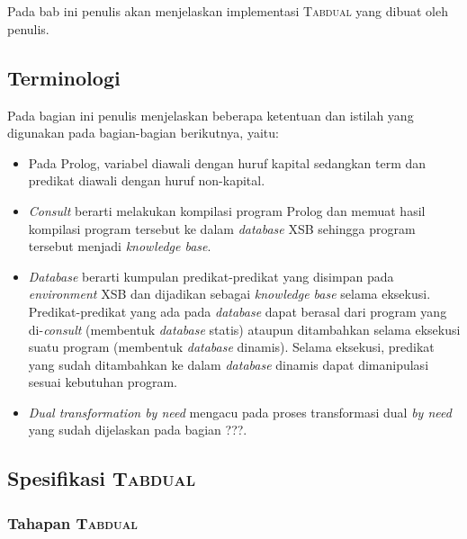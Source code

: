 \chapter{\babEmpat}
Pada bab ini penulis akan menjelaskan implementasi \textsc{Tabdual} yang dibuat oleh penulis.

\section{Terminologi}

Pada bagian ini penulis menjelaskan beberapa ketentuan dan istilah yang digunakan pada bagian-bagian berikutnya, yaitu:

\begin{itemize}
	\item Pada Prolog, variabel diawali dengan huruf kapital sedangkan term dan predikat diawali dengan huruf non-kapital.
	\item \textit{Consult} berarti melakukan kompilasi program Prolog dan memuat hasil kompilasi program tersebut ke dalam \textit{database} XSB sehingga program tersebut menjadi \textit{knowledge base}.
	\item \textit{Database} berarti kumpulan predikat-predikat yang disimpan pada \textit{environment} XSB dan dijadikan sebagai \textit{knowledge base} selama eksekusi. Predikat-predikat yang ada pada \textit{database} dapat berasal dari program yang di-\textit{consult} (membentuk \textit{database} statis) ataupun ditambahkan selama eksekusi suatu program (membentuk \textit{database} dinamis). Selama eksekusi, predikat yang sudah ditambahkan ke dalam \textit{database} dinamis dapat dimanipulasi sesuai kebutuhan program.
	\item \textit{Dual transformation by need} mengacu pada proses transformasi dual \textit{by need} yang sudah dijelaskan pada bagian ???.
\end{itemize}

\section{Spesifikasi \textsc{Tabdual}}

\subsection{Tahapan \textsc{Tabdual}}


